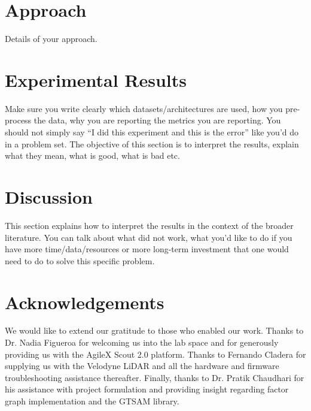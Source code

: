 \documentclass[10pt, reqno, letterpaper, twoside]{amsart}
\begin{document}
\section{Approach}

Details of your approach.

\section{Experimental Results}

Make sure you write clearly which datasets/architectures are used, how you pre-process the data, why you are reporting the metrics you are reporting. You should not simply say ``I did this experiment and this is the error'' like you'd do in a problem set. The objective of this section is to interpret the results, explain what they mean, what is good, what is bad etc.

\section{Discussion}

This section explains how to interpret the results in the context of the broader literature. You can talk about what did not work, what you'd like to do if you have more time/data/resources or more long-term investment that one would need to do to solve this specific problem.

\section{Acknowledgements}

We would like to extend our gratitude to those who enabled our work. Thanks to Dr. Nadia Figueroa for welcoming us into the lab space and for generously providing us with the AgileX Scout 2.0 platform. Thanks to Fernando Cladera for supplying us with the Velodyne LiDAR and all the hardware and firmware troubleshooting assistance thereafter. Finally, thanks to Dr. Pratik Chaudhari for his assistance with project formulation and providing insight regarding factor graph implementation and the GTSAM library.



\end{document}
